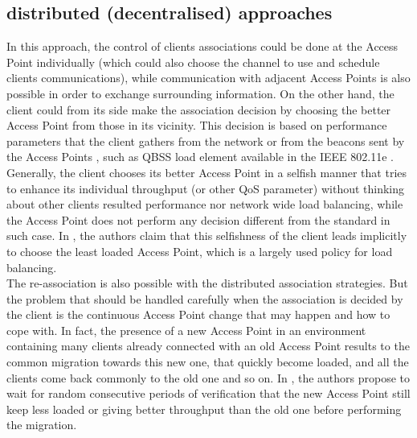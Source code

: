 \documentclass[journal,transmag]{IEEEtran}
\begin{document}
\subsection{distributed (decentralised) approaches}
In this approach, the control of clients associations could be done at the Access Point individually (which could also choose the channel to use and schedule clients communications), while communication with adjacent Access Points is also possible in order to exchange surrounding information. On the other hand, the client could from its side make the association decision by choosing the better Access Point from those in its vicinity. This decision is based on performance parameters that the client gathers from the network or from the beacons sent by the Access Points \cite{17QOS_AP_selection}, such as QBSS load element available in the IEEE 802.11e  \cite{09load_balancing_WLAN}. Generally, the client chooses its better Access Point in a selfish manner that tries to enhance its individual throughput (or other QoS parameter) without thinking about other clients resulted performance nor network wide load balancing, while the Access Point does not perform any decision different from the standard in such case. In \cite{09load_balancing_WLAN}, the authors claim that this selfishness of the client leads implicitly to choose the least loaded Access Point, which is a largely used policy for load balancing. \\
The re-association is also possible with the distributed association strategies. But the problem that should be handled carefully when the association is decided by the client is the continuous Access Point change that may happen and how to cope with. In fact, the presence of a new Access Point in an environment containing many clients already connected with an old Access Point results to the common migration towards this new one, that quickly become loaded, and all the clients come back commonly to the old one and so on. In \cite{09load_balancing_WLAN}, the authors propose to wait for random consecutive periods of verification that the new Access Point still keep less loaded or giving better throughput than the old one before performing the migration.
\end{document}
